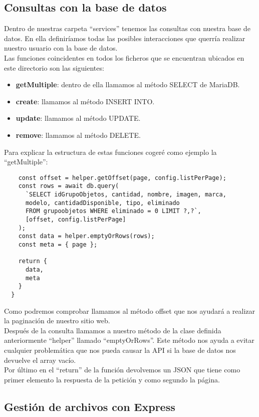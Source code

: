\subsection{Consultas con la base de datos}
Dentro de nuestras carpeta ``services'' tenemos las consultas con nuestra base de datos. En ella definiríamos todas las posibles interacciones que querría realizar nuestro usuario con la base de datos.
\\Las funciones coincidentes en todos los ficheros que se encuentran ubicados en este directorio son las siguientes:
\begin{itemize}
    \item \textbf{getMultiple}: dentro de ella llamamos al método SELECT de MariaDB.
    \item \textbf{create}: llamamos al método INSERT INTO.
    \item \textbf{update}: llamamos al método UPDATE.
    \item \textbf{remove}: llamamos al método DELETE.
\end{itemize}
Para explicar la estructura de estas funciones cogeré como ejemplo la ``getMultiple'':
\begin{verbatim}
    const offset = helper.getOffset(page, config.listPerPage);
    const rows = await db.query(
      `SELECT idGrupoObjetos, cantidad, nombre, imagen, marca, 
      modelo, cantidadDisponible, tipo, eliminado 
      FROM grupoobjetos WHERE eliminado = 0 LIMIT ?,?`,
      [offset, config.listPerPage]
    );
    const data = helper.emptyOrRows(rows);
    const meta = { page };
  
    return {
      data,
      meta
    }
  }
\end{verbatim}
Como podremos comprobar llamamos al método offset que nos ayudará a realizar la paginación de nuestro sitio web.
\\Después de la consulta llamamos a nuestro método de la clase definida anteriormente ``helper'' llamado ``emptyOrRows''. Este método nos ayuda a evitar cualquier problemática que nos pueda causar la API si la base de datos nos devuelve el array vacío.
\\Por último en el ``return'' de la función devolvemos un JSON que tiene como primer elemento la respuesta de la petición y como segundo la página.

\subsection{Gestión de archivos con Express}

